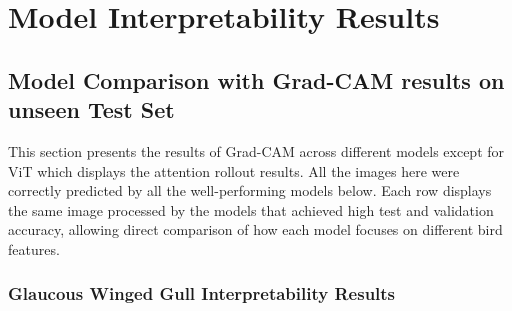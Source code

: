 \documentclass[a4paper,12pt]{report}
\begin{document}
\section{Model Interpretability Results}
\label{sec:interpretability}

\subsection{Model Comparison with Grad-CAM results on unseen Test Set}
This section presents the results of Grad-CAM across different models except for ViT which displays the attention rollout results. All the images here were correctly predicted by all the well-performing models below. Each row displays the same image processed by the models that achieved high test and validation accuracy, allowing direct comparison of how each model focuses on different bird features.

\subsubsection{Glaucous Winged Gull Interpretability Results}
\label{subsec:glaucous_interpretability}
\end{document}
